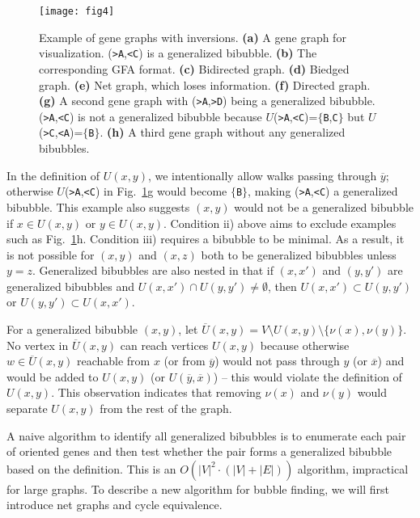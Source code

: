\documentclass[webpdf,contemporary,large,namedate]{oup-authoring-template}%
\begin{document}
\begin{figure}[t!]
\centering
\texttt{[image: fig4]}
\caption{Example of gene graphs with inversions.
{\bf (a)} A gene graph for visualization. ({\tt >A},{\tt <C}) is a generalized bibubble.
{\bf (b)} The corresponding GFA format.
{\bf (c)} Bidirected graph.
{\bf (d)} Biedged graph.
{\bf (e)} Net graph, which loses information.
{\bf (f)} Directed graph.
{\bf (g)} A second gene graph with ({\tt >A},{\tt >D}) being a generalized bibubble.
({\tt >A},{\tt <C}) is not a generalized bibubble because $U$({\tt >A},{\tt <C})=$\{${\tt B},{\tt C}$\}$
but $U$({\tt >C},{\tt <A})=$\{${\tt B}$\}$.
{\bf (h)} A third gene graph without any generalized bibubbles.
}\label{fig:inv}
\end{figure}

In the definition of $U(x,y)$, we intentionally allow walks passing through $\overline{y}$;
otherwise $U$({\tt >A},{\tt <C}) in Fig.~\ref{fig:inv}g would become $\{${\tt B}$\}$, making ({\tt >A},{\tt <C}) a generalized bibubble.
This example also suggests $(x,y)$ would not be a generalized bibubble if $x\in U(x,y)$ or $y\in U(x,y)$.
Condition ii) above aims to exclude examples such as Fig.~\ref{fig:inv}h.
Condition iii) requires a bibubble to be minimal.
As a result, it is not possible for $(x,y)$ and $(x,z)$ both to be generalized bibubbles unless $y=z$.
Generalized bibubbles are also nested in that
if $(x,x')$ and $(y,y')$ are generalized bibubbles and $U(x,x')\cap U(y,y')\not=\emptyset$,
then $U(x,x')\subset U(y,y')$ or $U(y,y')\subset U(x,x')$.

For a generalized bibubble $(x,y)$, let $\overline{U}(x,y)=V\setminus U(x,y)\setminus\{\nu(x),\nu(y)\}$.
No vertex in $\overline{U}(x,y)$ can reach vertices $U(x,y)$
because otherwise $w\in\overline{U}(x,y)$ reachable from $x$ (or from $\overline{y}$)
would not pass through $y$ (or $\overline{x}$) and would be added to $U(x,y)$ (or $U(\overline{y},\overline{x})$)
-- this would violate the definition of $U(x,y)$.
This observation indicates that removing $\nu(x)$ and $\nu(y)$ would separate $U(x,y)$ from the rest of the graph.

A naive algorithm to identify all generalized bibubbles is to enumerate each pair of oriented genes
and then test whether the pair forms a generalized bibubble based on the definition.
This is an $O(|V|^2\cdot(|V|+|E|))$ algorithm, impractical for large graphs.
To describe a new algorithm for bubble finding, we will first introduce net graphs and cycle equivalence.
\end{document}
